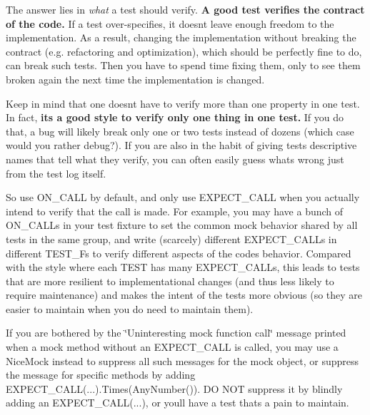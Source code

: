The answer lies in {\itshape what} a test should verify. {\bfseries A good test verifies the contract of the code.} If a test over-\/specifies, it doesn\textquotesingle{}t leave enough freedom to the implementation. As a result, changing the implementation without breaking the contract (e.\+g. refactoring and optimization), which should be perfectly fine to do, can break such tests. Then you have to spend time fixing them, only to see them broken again the next time the implementation is changed.

Keep in mind that one doesn\textquotesingle{}t have to verify more than one property in one test. In fact, {\bfseries it\textquotesingle{}s a good style to verify only one thing in one test.} If you do that, a bug will likely break only one or two tests instead of dozens (which case would you rather debug?). If you are also in the habit of giving tests descriptive names that tell what they verify, you can often easily guess what\textquotesingle{}s wrong just from the test log itself.

So use {\ttfamily O\+N\+\_\+\+C\+A\+LL} by default, and only use {\ttfamily E\+X\+P\+E\+C\+T\+\_\+\+C\+A\+LL} when you actually intend to verify that the call is made. For example, you may have a bunch of {\ttfamily O\+N\+\_\+\+C\+A\+LL}s in your test fixture to set the common mock behavior shared by all tests in the same group, and write (scarcely) different {\ttfamily E\+X\+P\+E\+C\+T\+\_\+\+C\+A\+LL}s in different {\ttfamily T\+E\+S\+T\+\_\+F}s to verify different aspects of the code\textquotesingle{}s behavior. Compared with the style where each {\ttfamily T\+E\+ST} has many {\ttfamily E\+X\+P\+E\+C\+T\+\_\+\+C\+A\+LL}s, this leads to tests that are more resilient to implementational changes (and thus less likely to require maintenance) and makes the intent of the tests more obvious (so they are easier to maintain when you do need to maintain them).

If you are bothered by the \char`\"{}\+Uninteresting mock function call\char`\"{} message printed when a mock method without an {\ttfamily E\+X\+P\+E\+C\+T\+\_\+\+C\+A\+LL} is called, you may use a {\ttfamily Nice\+Mock} instead to suppress all such messages for the mock object, or suppress the message for specific methods by adding {\ttfamily E\+X\+P\+E\+C\+T\+\_\+\+C\+A\+LL(...).Times(\+Any\+Number())}. DO N\+OT suppress it by blindly adding an {\ttfamily E\+X\+P\+E\+C\+T\+\_\+\+C\+A\+LL(...)}, or you\textquotesingle{}ll have a test that\textquotesingle{}s a pain to maintain.

